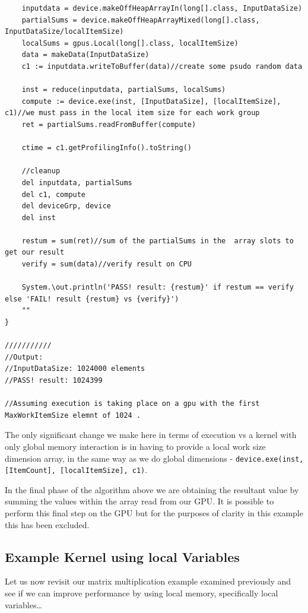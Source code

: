 \documentclass[conc-doc]{subfiles}
\begin{document}
\begin{lstlisting}
	inputdata = device.makeOffHeapArrayIn(long[].class, InputDataSize)
	partialSums = device.makeOffHeapArrayMixed(long[].class, InputDataSize/localItemSize)
	localSums = gpus.Local(long[].class, localItemSize)
	data = makeData(InputDataSize)
	c1 := inputdata.writeToBuffer(data)//create some psudo random data
	
	inst = reduce(inputdata, partialSums, localSums)
	compute := device.exe(inst, [InputDataSize], [localItemSize], c1)//we must pass in the local item size for each work group
	ret = partialSums.readFromBuffer(compute)
	
	ctime = c1.getProfilingInfo().toString()
	
	//cleanup  
	del inputdata, partialSums
	del c1, compute
	del deviceGrp, device
	del inst
	
	restum = sum(ret)//sum of the partialSums in the  array slots to get our result
	verify = sum(data)//verify result on CPU
	
	System.\out.println('PASS! result: {restum}' if restum == verify else 'FAIL! result {restum} vs {verify}')
	""
}

///////////
//Output:
//InputDataSize: 1024000 elements
//PASS! result: 1024399

//Assuming execution is taking place on a gpu with the first MaxWorkItemSize elemnt of 1024 .
\end{lstlisting}

The only significant change we make here in terms of execution vs a kernel with only global memory interaction is in having to provide a local work size dimension array, in the same way as we do global dimensions - \lstinline{device.exe(inst, [ItemCount], [localItemSize], c1)}.

In the final phase of the algorithm above we are obtaining the resultant value by summing the values within the array read from our GPU. It is possible to perform this final step on the GPU but for the purposes of clarity in this example this has been excluded.

\subsection{Example Kernel using local Variables}
Let us now revisit our matrix multiplication example examined previously and see if we can improve performance by using local memory, specifically local variables…
\end{document}
